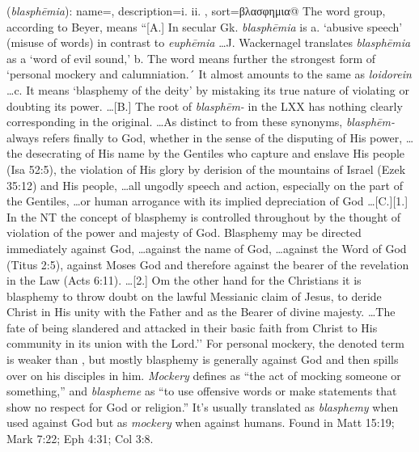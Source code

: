 \item[Blasphemy,]

(\textit{blasphēmia}):
{
    name=,
    description={i.  ii. },
    sort=βλασφημια@
}
The word group, according to Beyer, means 
``[A.] In secular Gk. \emph{blasphēmia} is a. `abusive speech' (misuse of words) in contrast to \emph{euphēmia} \ldots J. Wackernagel translates \emph{blasphēmia} as a `word of evil sound,' b. The word means further the strongest form of `personal mockery and calumniation.´ It almost amounts to the same as \emph{loidorein} \ldots c. It means `blasphemy of the deity' by mistaking its true nature of violating or doubting its power. \ldots [B.] The root of \emph{blasphēm-} in the LXX has nothing clearly corresponding in the original. \ldots As distinct to from these synonyms, \emph{blasphēm-} always refers finally to God, whether in the sense of the disputing of His power, \ldots the desecrating of His name by the Gentiles who capture and enslave His people (Isa 52:5), the violation of His glory by derision of the mountains of Israel (Ezek 35:12) and His people, \ldots all ungodly speech and action, especially on the part of the Gentiles, \ldots or human arrogance with its implied depreciation of God \ldots [C.][1.] In the NT the concept of blasphemy is controlled throughout by the thought of violation of the power and majesty of God. Blasphemy may be directed immediately against God, \ldots against the name of God, \ldots against the Word of God (Titus 2:5), against Moses God and therefore against the bearer of the revelation in the Law (Acts 6:11). \ldots [2.] Om the other hand for the Christians it is blasphemy to throw doubt on the lawful Messianic claim of Jesus, to deride Christ in His unity with the Father and as the Bearer of divine majesty. \ldots The fate of being slandered and attacked in their basic faith from Christ to His community in its union with the Lord.'' 
For personal mockery, the denoted term is weaker than , but mostly blasphemy is generally against God and then spills over on his disciples in him. \emph{Mockery} defines as ``the act of mocking someone or something,'' and \emph{blaspheme} as ``to use offensive words or make statements that show no respect for God or religion.'' It's usually translated as \emph{blasphemy} when used against God but as \emph{mockery} when against humans.
Found in Matt 15:19; Mark 7:22; Eph 4:31; Col 3:8.
